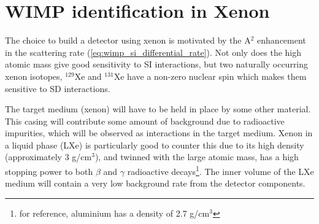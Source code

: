 \section{WIMP identification in Xenon}
\label{sec:wimps_with_xenon}

\par
The choice to build a detector using xenon is motivated by the A$^2$ enhancement in the scattering rate (\autoref{eq:wimp_si_differential_rate}).
Not only does the high atomic mass give good sensitivity to SI interactions, but two naturally occurring xenon isotopes, ${}^{129}$Xe and ${}^{131}$Xe have a non-zero nuclear spin which makes them sensitive to SD interactions.
\par
The target medium (xenon) will have to be held in place by some other material.
This casing will contribute some amount of background due to radioactive impurities, which will be observed as interactions in the target medium.
Xenon in a liquid phase (LXe) is particularly good to counter this due to its high density (approximately 3 g/cm${}^{3}$), and twinned with the large atomic mass, has a high stopping power to both $\beta$ and $\gamma$ radioactive decays\footnote{for reference, aluminium has a density of 2.7 g/cm${}^{3}$}.
The inner volume of the LXe medium will contain a very low background rate from the detector components.



